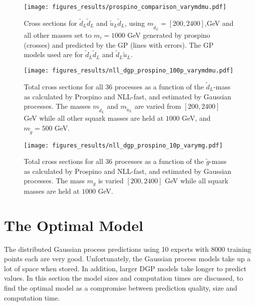 \documentclass[twoside,english]{uiofysmaster}
\begin{document}
\begin{figure}
\centering
\texttt{[image: figures\_results/prospino\_comparison\_varymdmu.pdf]}
\caption{Cross sections for $\tilde{d}_L \tilde{d}_L$ and $\tilde{u}_L \tilde{d}_L$, using $m_{\tilde{d}_L}=[200, 2400]$,GeV and all other masses set to $m_i = 1000$ GeV generated by prospino (crosses) and predicted by the GP (lines with errors). The GP models used are for $\tilde{d}_L \tilde{d}_L$ and $\tilde{d}_L \tilde{u}_L$.}
\label{Fig:: results : dLuL uLuL prospino dgp}
\end{figure}


\begin{figure}
\centering
\texttt{[image: figures\_results/nll\_dgp\_prospino\_100p\_varymdmu.pdf]}
\caption{Total cross sections for all 36 processes as a function of the $\tilde{d}_L$-mass as calculated by Prospino and NLL-fast, and estimated by Gaussian processes. The masses $m_{\tilde{d}_L}$ and $m_{\tilde{u}_L}$ are varied from $[200, 2400]$ GeV while all other squark masses are held at $1000$ GeV, and $m_{\tilde{g}}=500$ GeV.}
\label{Fig:: results : Total cross sections dgp prospino nll}
\end{figure}

\begin{figure}
\centering
\texttt{[image: figures\_results/nll\_dgp\_prospino\_10p\_varymg.pdf]}
\caption{Total cross sections for all 36 processes as a function of the $\tilde{g}$-mass as calculated by Prospino and NLL-fast, and estimated by Gaussian processes. The mass $m_{g}$ is varied $[200, 2400]$ GeV while all squark masses are held at $1000$ GeV.}
\label{Fig:: results : Total cross sections varymg dgp prospino nll}
\end{figure}





\section{The Optimal Model}\label{Sec:: results : The Optimal Model}

The distributed Gaussian process predictions using 10 experts with 8000 training points each are very good. Unfortunately, the Gaussian process models take up a lot of space when stored. In addition, larger DGP models take longer to predict values. In this section the model sizes and computation times are discussed, to find the optimal model as a compromise between prediction quality, size and computation time.
\end{document}

